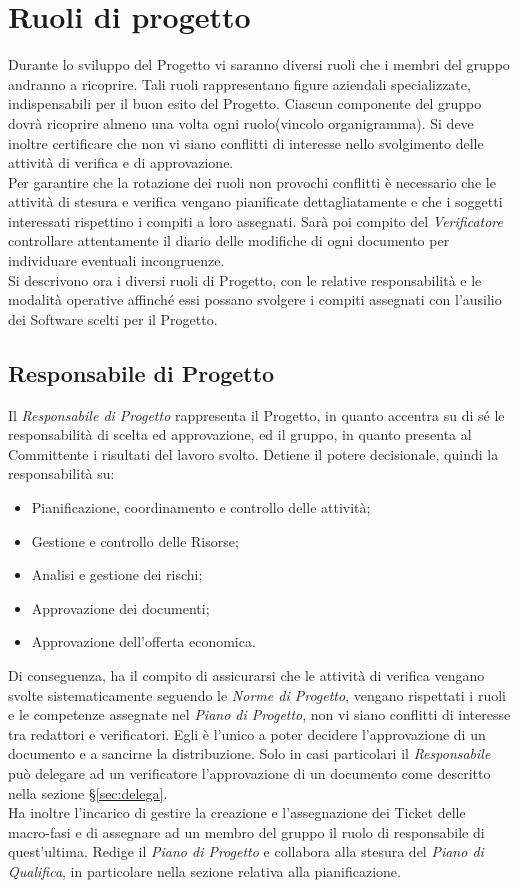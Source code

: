 \section{Ruoli di progetto}
Durante lo sviluppo del Progetto vi saranno diversi ruoli che i membri del gruppo andranno a ricoprire. Tali ruoli rappresentano figure aziendali specializzate, indispensabili per il buon esito del Progetto. Ciascun componente del gruppo dovrà ricoprire almeno una volta ogni ruolo(vincolo organigramma). Si deve inoltre certificare che non vi siano conflitti di interesse nello svolgimento delle attività di verifica e di approvazione.\\
Per garantire che la rotazione dei ruoli non provochi conflitti è necessario che le attività di stesura e verifica vengano pianificate dettagliatamente e che i soggetti interessati rispettino i compiti a loro assegnati. Sarà poi compito del \textit{Verificatore} controllare attentamente il diario delle modifiche di ogni documento per individuare eventuali incongruenze.\\
Si descrivono ora i diversi ruoli di Progetto, con le relative responsabilità e le modalità operative affinché essi possano svolgere i compiti assegnati con l'ausilio dei Software scelti per il Progetto.
\subsection{Responsabile di Progetto}
Il \textit{Responsabile di Progetto} rappresenta il Progetto, in quanto accentra su di sé le responsabilità di scelta ed approvazione, ed il gruppo, in quanto presenta al Committente i risultati del lavoro svolto.
Detiene il potere decisionale, quindi la responsabilità su:
\begin{itemize}
\item Pianificazione, coordinamento e controllo delle attività;
\item Gestione e controllo delle Risorse;
\item Analisi e gestione dei rischi;
\item Approvazione dei documenti;
\item Approvazione dell'offerta economica.
\end{itemize}
Di conseguenza, ha il compito di assicurarsi che le attività di verifica vengano svolte sistematicamente seguendo le \textit{Norme di Progetto}, vengano rispettati i ruoli e le competenze assegnate nel \textit{Piano di Progetto}, non vi siano conflitti di interesse tra redattori e verificatori. Egli è l'unico a poter decidere l'approvazione di un documento e a sancirne
la distribuzione. Solo in casi particolari il \textit{Responsabile} può delegare ad un verificatore l'approvazione di un documento come descritto nella sezione \S\ref{sec:delega}. \\
Ha inoltre l'incarico di gestire la creazione e l'assegnazione dei Ticket delle macro-fasi e di assegnare ad un membro del gruppo il ruolo di responsabile di quest’ultima.
Redige il \textit{Piano di Progetto} e collabora alla stesura del \textit{Piano di Qualifica}, in particolare nella sezione relativa alla pianificazione.


